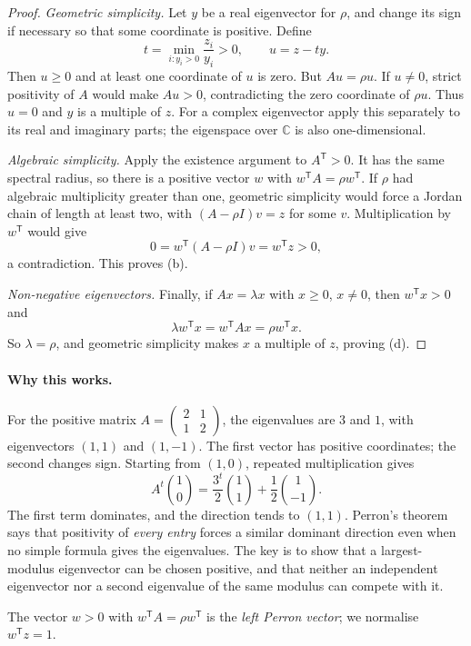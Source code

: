 \begin{proof}
\emph{Geometric simplicity.}
Let $y$ be a real eigenvector for $\rho$,
and change its sign if necessary so that
some coordinate is positive. Define
\[
t=\min_{i:y_i>0}\frac{z_i}{y_i}>0,
\qquad u=z-ty.
\]
Then $u\ge0$ and at least one
coordinate of $u$ is zero.
But $Au=\rho u$. If $u\ne0$,
strict positivity of $A$ would
make $Au>0$, contradicting
the zero coordinate of $\rho u$.
Thus $u=0$ and $y$ is a multiple
of $z$. For a complex eigenvector
apply this separately to its real
and imaginary parts; the eigenspace
over $\mathbb C$ is also one-dimensional.

\emph{Algebraic simplicity.}
Apply the existence argument to
$A^{\mathsf T}>0$. It has the same
spectral radius, so there is a
positive vector $w$ with
$w^{\mathsf T}A=\rho w^{\mathsf T}$.
If $\rho$ had algebraic multiplicity
greater than one, geometric simplicity
would force a Jordan chain of length
at least two, with
$(A-\rho I)v=z$ for some $v$.
Multiplication by $w^{\mathsf T}$
would give
\[
0=w^{\mathsf T}(A-\rho I)v
=w^{\mathsf T}z>0,
\]
a contradiction. This proves (b).

\emph{Non-negative eigenvectors.}
Finally, if $Ax=\lambda x$ with
$x\ge0$, $x\ne0$, then
$w^{\mathsf T}x>0$ and
\[
\lambda w^{\mathsf T}x
=w^{\mathsf T}Ax
=\rho w^{\mathsf T}x.
\]
So $\lambda=\rho$, and geometric
simplicity makes $x$ a multiple
of $z$, proving (d).
\end{proof}

\paragraph{Why this works.}
For the positive matrix $A=\begin{pmatrix}2&1\\1&2\end{pmatrix}$, the eigenvalues are $3$ and $1$, with eigenvectors $(1,1)$ and $(1,-1)$. The first vector has positive coordinates; the second changes sign. Starting from $(1,0)$, repeated multiplication gives
\[
A^t\binom10=\frac{3^t}{2}\binom11+\frac12\binom1{-1}.
\]
The first term dominates, and the direction tends to $(1,1)$. Perron's theorem says that positivity of \emph{every entry} forces a similar dominant direction even when no simple formula gives the eigenvalues. The key is to show that a largest-modulus eigenvector can be chosen positive, and that neither an independent eigenvector nor a second eigenvalue of the same modulus can compete with it.

The vector $w>0$ with $w^{\mathsf T}A=\rho w^{\mathsf T}$ is the \emph{left Perron vector}; we normalise $w^{\mathsf T}z=1$.

